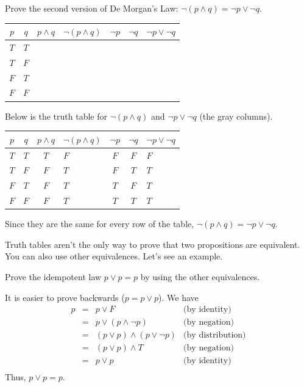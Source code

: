 \begin{exer}
Prove the second version of De Morgan's Law: 
$\neg (p\wedge q) = \neg p \vee \neg q$.\\
\pflinetwo
\bigskip

\centering
{\large 
\begin{tabular}{|cc||c|g|c|c|g|} 
\hline 
$p$ & $q$ & $p\wedge q$ &
$\neg (p\wedge q)$ & $\neg p$ &
$\neg q$ & $\neg p \vee \neg q$ \\
\hline 
$T$ & $T$ & & &&&  \\
$T$ & $F$ & & &&& \\
$F$ & $T$ & & &&& \\ 
$F$ & $F$ & & &&& \\
\hline
\end{tabular}
}
\begin{answer}
Below is the truth table for $\neg (p\wedge q)$ and  $\neg p \vee \neg q$ (the gray columns).

\centering
\begin{tabular}{|cc||c|g|c|c|g|} 
\hline 
$p$ & $q$ & $p\wedge q$ & $\neg (p\wedge q)$ & $\neg p$ & $\neg q$ & $\neg p \vee \neg q$ \\
\hline 
$T$ & $T$ & $T$ & $F $ & $F $ & $F $ & $F$ \\
$T$ & $F$ & $F$ & $T $ & $F $ & $T $ & $T$ \\
$F$ & $T$ & $F$ & $T $ & $T $ & $F $ & $T$ \\ 
$F$ & $F$ & $F$ & $T $ & $T $ & $T $ & $T$ \\
\hline
\end{tabular}

Since they are the same for every row of the table,  $\neg (p\wedge q) = \neg p \vee \neg q$.
\end{answer}
\end{exer}

Truth tables aren't the only way to prove that two propositions are equivalent.
You can also use other equivalences.  Let's see an example.

\begin{exa}
Prove the idempotent law
$p \vee p = p$ by using the
other equivalences.   
\begin{pf}
It is easier to prove backwards ($p=p\vee p$). We have 
$$
\begin{array}{llll}
p &=&p \vee F &\mbox{(by identity)}\\
&=& p \vee (p\wedge \neg p) &\mbox{(by negation)}\\
&=&(p \vee p)\wedge(p \vee\neg p) &\mbox{(by distribution)}\\
&=&(p\vee p)\wedge T &\mbox{(by negation)}\\
&=&p\vee p &\mbox{(by identity)}\\
\end{array}
$$
Thus, $p \vee p = p$.
\end{pf}
\end{exa}

